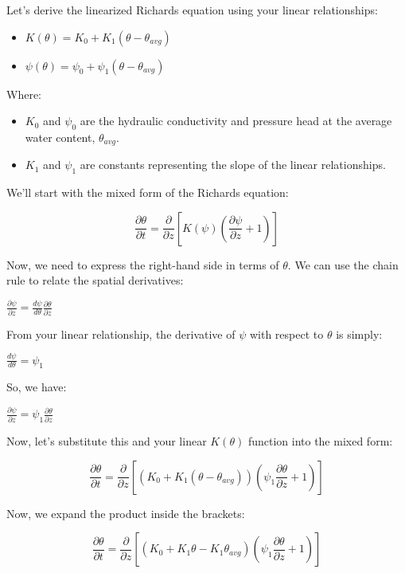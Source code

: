 \documentclass[
]{article}
\begin{document}
Let's derive the linearized Richards equation using your linear
relationships:

\begin{itemize}
\item
  \(K(\theta) = K_0 + K_1 (\theta - \theta_{avg})\)
\item
  \(\psi(\theta) = \psi_0 + \psi_1 (\theta - \theta_{avg})\)
\end{itemize}

Where:

\begin{itemize}
\item
  \(K_0\) and \(\psi_0\) are the hydraulic conductivity and pressure
  head at the average water content, \(\theta_{avg}\).
\item
  \(K_1\) and \(\psi_1\) are constants representing the slope of the
  linear relationships.
\end{itemize}

We'll start with the mixed form of the Richards equation:

\[\frac{\partial \theta}{\partial t} = \frac{\partial}{\partial z} \left[ K(\psi) \left( \frac{\partial \psi}{\partial z} + 1 \right) \right]\]

Now, we need to express the right-hand side in terms of \(\theta\). We
can use the chain rule to relate the spatial derivatives:

\(\frac{\partial \psi}{\partial z} = \frac{d\psi}{d\theta} \frac{\partial \theta}{\partial z}\)

From your linear relationship, the derivative of \(\psi\) with respect
to \(\theta\) is simply:

\(\frac{d\psi}{d\theta} = \psi_1\)

So, we have:

\(\frac{\partial \psi}{\partial z} = \psi_1 \frac{\partial \theta}{\partial z}\)

Now, let's substitute this and your linear \(K(\theta)\) function into
the mixed form:

\[\frac{\partial \theta}{\partial t} = \frac{\partial}{\partial z} \left[ (K_0 + K_1 (\theta - \theta_{avg})) \left( \psi_1 \frac{\partial \theta}{\partial z} + 1 \right) \right]\]

Now, we expand the product inside the brackets:

\[\frac{\partial \theta}{\partial t} = \frac{\partial}{\partial z} \left[ (K_0 + K_1 \theta - K_1 \theta_{avg}) (\psi_1 \frac{\partial \theta}{\partial z} + 1) \right]\]
\end{document}
